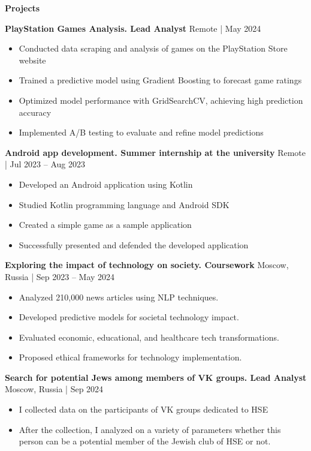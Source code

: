 \begin{center}
    \textbf{Projects}
\end{center}

\textbf{PlayStation Games Analysis. Lead Analyst} \hfill Remote | May 2024
\begin{itemize}[noitemsep, topsep=0pt, partopsep=0pt, parsep=0pt]
    \item Conducted data scraping and analysis of games on the PlayStation Store website
    \item Trained a predictive model using Gradient Boosting to forecast game ratings
    \item Optimized model performance with GridSearchCV, achieving high prediction accuracy
    \item Implemented A/B testing to evaluate and refine model predictions
\end{itemize}

\textbf{Android app development. Summer internship at the university} \hfill Remote | Jul 2023 – Aug 2023
\begin{itemize}[noitemsep, topsep=0pt, partopsep=0pt, parsep=0pt]
    \item Developed an Android application using Kotlin
    \item Studied Kotlin programming language and Android SDK
    \item Created a simple game as a sample application
    \item Successfully presented and defended the developed application
\end{itemize}

\textbf{Exploring the impact of technology on society. Coursework} \hfill Moscow, Russia | Sep 2023 – May 2024
\begin{itemize}[noitemsep, topsep=0pt, partopsep=0pt, parsep=0pt]
    \item Analyzed 210,000 news articles using NLP techniques.
    \item Developed predictive models for societal technology impact.
    \item Evaluated economic, educational, and healthcare tech transformations.
    \item Proposed ethical frameworks for technology implementation.
\end{itemize}

\textbf{Search for potential Jews among members of VK groups. Lead Analyst} \hfill Moscow, Russia | Sep 2024
\begin{itemize}[noitemsep, topsep=0pt, partopsep=0pt, parsep=0pt]
    \item I collected data on the participants of VK groups dedicated to HSE
    \item After the collection, I analyzed on a variety of parameters whether this person can be a potential member of the Jewish club of HSE or not.
\end{itemize}